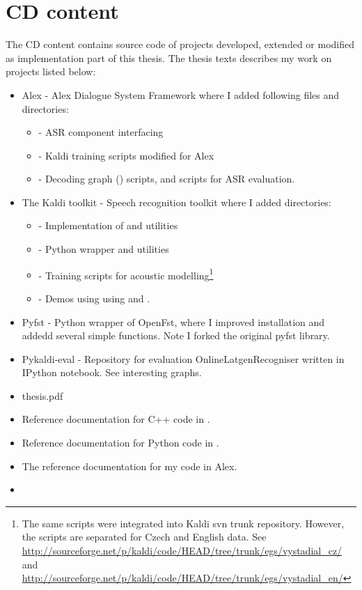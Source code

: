 \chapter{CD content}
\label{cha:cd_content}
The CD content contains source code of projects developed, extended or modified as implementation part of this thesis.
The thesis texts describes my work on projects listed below:

\begin{itemize}
    \item Alex - Alex Dialogue System Framework where I added following files and directories:
        \begin{itemize}
            \item {} - ASR component interfacing 
            \item {} - Kaldi training scripts modified for Alex 
            \item {} - Decoding graph () scripts, and scripts for \acs{ASR} evaluation.
        \end{itemize}
    \item The Kaldi toolkit - Speech recognition toolkit where I added directories:
        \begin{itemize}
            \item {} - Implementation of  and utilities 
            \item {} - Python wrapper  and utilities
            \item {} - Training scripts for acoustic modelling\footnote{The same scripts were integrated into Kaldi svn trunk repository. However, the scripts are separated for Czech and English data. See \url{http://sourceforge.net/p/kaldi/code/HEAD/tree/trunk/egs/vystadial_cz/} and \url{http://sourceforge.net/p/kaldi/code/HEAD/tree/trunk/egs/vystadial_en/}}
            \item {} - Demos using using  and .
        \end{itemize} 
    \item Pyfst - Python wrapper of OpenFst, where I improved installation and addedd several simple functions. Note I forked the original pyfst library.
    \item Pykaldi-eval - Repository for evaluation OnlineLatgenRecogniser written in IPython notebook. See interesting graphs.
    \item thesis.pdf
    \item Reference documentation for C++ code in .
    \item Reference documentation for Python code in .
    \item The reference documentation for my code in Alex.
    \item {}
\end{itemize}
